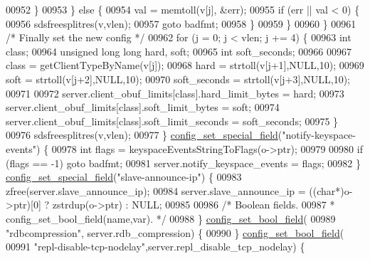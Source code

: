 \begin{DoxyCode}
{{{{{{{{00952                 \}
00953             \} \textcolor{keywordflow}{else} \{
00954                 val = memtoll(v[j], &err);
00955                 \textcolor{keywordflow}{if} (err || val < 0) \{
00956                     sdsfreesplitres(v,vlen);
00957                     \textcolor{keywordflow}{goto} badfmt;
00958                 \}
00959             \}
00960         \}
00961         \textcolor{comment}{/* Finally set the new config */}
00962         \textcolor{keywordflow}{for} (j = 0; j < vlen; j += 4) \{
00963             \textcolor{keywordtype}{int} \textcolor{keyword}{class};
00964             \textcolor{keywordtype}{unsigned} \textcolor{keywordtype}{long} \textcolor{keywordtype}{long} hard, soft;
00965             \textcolor{keywordtype}{int} soft\_seconds;
00966 
00967             \textcolor{keyword}{class} = getClientTypeByName(v[j]);
00968             hard = strtoll(v[j+1],NULL,10);
00969             soft = strtoll(v[j+2],NULL,10);
00970             soft\_seconds = strtoll(v[j+3],NULL,10);
00971 
00972             server.client\_obuf\_limits[\textcolor{keyword}{class}].hard\_limit\_bytes = hard;
00973             server.client\_obuf\_limits[\textcolor{keyword}{class}].soft\_limit\_bytes = soft;
00974             server.client\_obuf\_limits[\textcolor{keyword}{class}].soft\_limit\_seconds = soft\_seconds;
00975         \}
00976         sdsfreesplitres(v,vlen);
00977     \} \hyperlink{config_8c_a7bdda941057dd2668e0e5b5df1d3ab4c}{config\_set\_special\_field}(\textcolor{stringliteral}{"notify-keyspace-events"}) \{
00978         \textcolor{keywordtype}{int} flags = keyspaceEventsStringToFlags(o->ptr);
00979 
00980         \textcolor{keywordflow}{if} (flags == -1) \textcolor{keywordflow}{goto} badfmt;
00981         server.notify\_keyspace\_events = flags;
00982     \} \hyperlink{config_8c_a7bdda941057dd2668e0e5b5df1d3ab4c}{config\_set\_special\_field}(\textcolor{stringliteral}{"slave-announce-ip"}) \{
00983         zfree(server.slave\_announce\_ip);
00984         server.slave\_announce\_ip = ((\textcolor{keywordtype}{char}*)o->ptr)[0] ? zstrdup(o->ptr) : NULL;
00985 
00986     \textcolor{comment}{/* Boolean fields.}
00987 \textcolor{comment}{     * config\_set\_bool\_field(name,var). */}
00988     \} \hyperlink{config_8c_a345bb09b35c40e88bc2e2e3c3a1db6b0}{config\_set\_bool\_field}(
00989       \textcolor{stringliteral}{"rdbcompression"}, server.rdb\_compression) \{
00990     \} \hyperlink{config_8c_a345bb09b35c40e88bc2e2e3c3a1db6b0}{config\_set\_bool\_field}(
00991       \textcolor{stringliteral}{"repl-disable-tcp-nodelay"},server.repl\_disable\_tcp\_nodelay) \{
}}}}}}}}
\end{DoxyCode}
